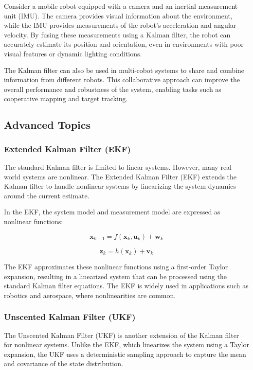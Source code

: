 \documentclass[conference]{IEEEtran}
\begin{document}
Consider a mobile robot equipped with a camera and an inertial measurement unit (IMU). The camera
provides visual information about the environment, while the IMU provides measurements of the
robot's acceleration and angular velocity. By fusing these measurements using a Kalman filter, the
robot can accurately estimate its position and orientation, even in environments with poor visual
features or dynamic lighting conditions.

The Kalman filter can also be used in multi-robot systems to share and combine information from
different robots. This collaborative approach can improve the overall performance and robustness
of the system, enabling tasks such as cooperative mapping and target tracking.

\subsection{Advanced Topics}

\subsubsection{Extended Kalman Filter (EKF)}
The standard Kalman filter is limited to linear systems. However, many real-world systems are
nonlinear. The Extended Kalman Filter (EKF) extends the Kalman filter to handle nonlinear systems
by linearizing the system dynamics around the current estimate.

In the EKF, the system model and measurement model are expressed as nonlinear functions:

\[
    \mathbf{x}_{k+1} = f(\mathbf{x}_k, \mathbf{u}_k) + \mathbf{w}_k
\]

\[
    \mathbf{z}_k = h(\mathbf{x}_k) + \mathbf{v}_k
\]

The EKF approximates these nonlinear functions using a first-order Taylor expansion, resulting in a
linearized system that can be processed using the standard Kalman filter equations. The EKF is
widely used in applications such as robotics and aerospace, where nonlinearities are common.

\subsubsection{Unscented Kalman Filter (UKF)}
The Unscented Kalman Filter (UKF) is another extension of the Kalman filter for nonlinear systems.
Unlike the EKF, which linearizes the system using a Taylor expansion, the UKF uses a deterministic
sampling approach to capture the mean and covariance of the state distribution.
\end{document}
